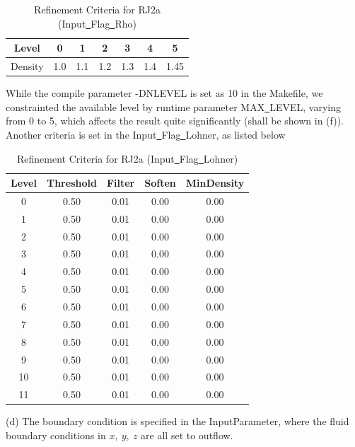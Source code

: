 \documentclass[a4paper,10pt]{article}
\begin{document}
\begin{table}[h]  %
\centering  %
\begin{tabular}[t]{|c|c|c|c|c|c|c|}
\hline
Level & 0 & 1 & 2 & 3 &4 &5 \\
\hline
Density  & 1.0 & 1.1 & 1.2 & 1.3 & 1.4 & 1.45 \\
\hline
\end{tabular}
\caption{Refinement Criteria for RJ2a (Input\underline{\ }Flag\underline{\ }Rho)}  %
\end{table}

While the compile parameter -DNLEVEL is set as 10 in the Makefile, we constrainted the available level by runtime parameter MAX\underline{\ }LEVEL, varying from 0 to 5, which affects the result quite significantly (shall be shown in (f)). Another criteria is set in the Input\underline{\ }Flag\underline{\ }Lohner, as listed below

\begin{table}[h]  %
\centering  %
\begin{tabular}[t]{|c|c|c|c|c|}
\hline
Level & Threshold & Filter & Soften & MinDensity\\
\hline
0  & 0.50 & 0.01 & 0.00 & 0.00\\
\hline
1  & 0.50 & 0.01 & 0.00 & 0.00\\
\hline
2  & 0.50 & 0.01 & 0.00 & 0.00\\
\hline
3  & 0.50 & 0.01 & 0.00 & 0.00\\
\hline
4  & 0.50 & 0.01 & 0.00 & 0.00\\
\hline
5  & 0.50 & 0.01 & 0.00 & 0.00\\
\hline
6  & 0.50 & 0.01 & 0.00 & 0.00\\
\hline
7  & 0.50 & 0.01 & 0.00 & 0.00\\
\hline
8  & 0.50 & 0.01 & 0.00 & 0.00\\
\hline
9  & 0.50 & 0.01 & 0.00 & 0.00\\
\hline
10  & 0.50 & 0.01 & 0.00 & 0.00\\
\hline
11  & 0.50 & 0.01 & 0.00 & 0.00\\
\hline
\end{tabular}
\caption{Refinement Criteria for RJ2a (Input\underline{\ }Flag\underline{\ }Lohner)}  %
\end{table}

\setlength{\parindent}{0em}(d) The boundary condition is specified in the Input\underline{\quad}Parameter, where the fluid boundary conditions in $x,\ y, \ z$ are all set to outflow.\\
\end{document}

